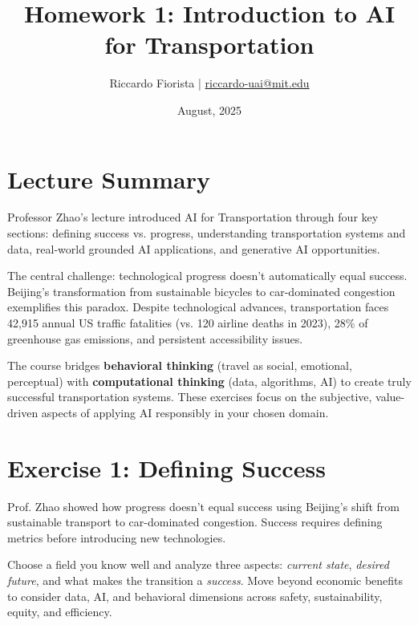 \documentclass[11pt]{article}
\title{Homework 1: Introduction to AI for Transportation}
\author{Riccardo Fiorista | \href{mailto:riccardo-uai@mit.edu}{riccardo-uai@mit.edu}}
\date{August, 2025}
\begin{document}
\maketitle
\thispagestyle{fancy}

\section*{Lecture Summary}

Professor Zhao's lecture introduced AI for Transportation through four key sections: defining success vs. progress, understanding transportation systems and data, real-world grounded AI applications, and generative AI opportunities.

The central challenge: technological progress doesn't automatically equal success. Beijing's transformation from sustainable bicycles to car-dominated congestion exemplifies this paradox. Despite technological advances, transportation faces 42,915 annual US traffic fatalities (vs. 120 airline deaths in 2023), 28\% of greenhouse gas emissions, and persistent accessibility issues.

The course bridges \textbf{behavioral thinking} (travel as social, emotional, perceptual) with \textbf{computational thinking} (data, algorithms, AI) to create truly successful transportation systems. These exercises focus on the subjective, value-driven aspects of applying AI responsibly in your chosen domain.

\section*{Exercise 1: Defining Success}

\begin{center}
\end{center}

Prof. Zhao showed how progress doesn't equal success using Beijing's shift from sustainable transport to car-dominated congestion. Success requires defining metrics before introducing new technologies.

Choose a field you know well and analyze three aspects: \textit{current state}, \textit{desired future}, and what makes the transition a \textit{success}. Move beyond economic benefits to consider data, AI, and behavioral dimensions across safety, sustainability, equity, and efficiency.
\end{document}
